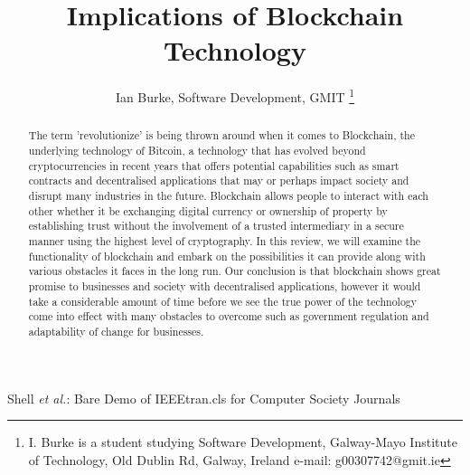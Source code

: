 \documentclass[report]{IEEEtran}
\begin{document}
\title{Implications of Blockchain Technology}
\author{Ian Burke, Software Development, GMIT %
\thanks{I. Burke is a student studying
Software Development, Galway-Mayo Institute of Technology, Old Dublin Rd, Galway, Ireland e-mail: g00307742@gmit.ie}%
}

\maketitle

\begin{abstract}
The term 'revolutionize' is being thrown around when it comes to Blockchain, the underlying technology of Bitcoin, a technology that has evolved beyond cryptocurrencies in recent years that offers potential capabilities such as smart contracts and decentralised applications that may or perhaps impact society and disrupt many industries in the future. Blockchain allows people to interact with each other whether it be exchanging digital currency or ownership of property by establishing trust without the involvement of a trusted intermediary in a secure manner using the highest level of cryptography. In this review, we will examine the functionality of blockchain and embark on the possibilities it can provide along with various obstacles it faces in the long run. Our conclusion is that blockchain shows great promise to businesses and society with decentralised applications, however it would take a considerable amount of time before we see the true power of the technology come into effect with many obstacles to overcome such as government regulation and adaptability of change for businesses.
\end{abstract}

%
{Shell \MakeLowercase{\textit{et al.}}: Bare Demo of IEEEtran.cls for Computer Society Journals}
\end{document}
